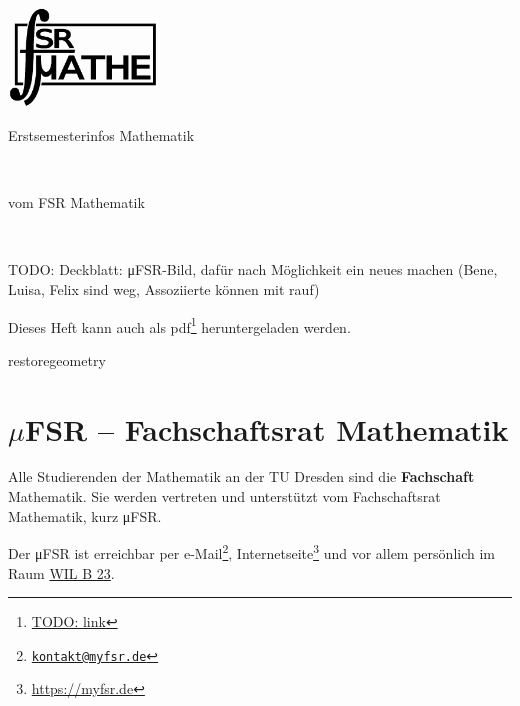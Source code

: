 \documentclass{scrartcl}
\begin{document}
%
%
%
\newcommand{\keyword}{\textbf}
\newcommand{\todo}[1]{\marginpar{TODO\\#1}}
\newpage
{ 
  \thispagestyle{empty} %
  \begin{flushright}
    \includegraphics[width=0.3\textwidth]{./fsrlogos/bw_1024.png}
  \end{flushright}
  \begin{center}
    \begin{huge}
      Erstsemesterinfos Mathematik
    \end{huge}\\\bigskip
    \begin{Large}
      vom FSR Mathematik
    \end{Large}\\\bigskip
  \end{center}
  TODO: Deckblatt: μFSR-Bild, dafür nach Möglichkeit ein neues machen (Bene, Luisa, Felix sind weg, Assoziierte können mit rauf) 
  \vfill
  \begin{small}
    Dieses Heft kann auch als pdf\footnote{\url{TODO: link}} heruntergeladen werden.
  \end{small}
  \newpage
}
restoregeometry %
\pagestyle{plain}
\section*{\texorpdfstring{$\mu$}{my}FSR -- Fachschaftsrat Mathematik}
Alle Studierenden der Mathematik an der TU Dresden sind die \keyword{Fachschaft} Mathematik.
Sie werden vertreten und unterstützt vom Fachschaftsrat Mathematik, kurz μFSR.

Der μFSR ist erreichbar per e-Mail\footnote{\href{mailto:kontakt@myfsr.de}{\nolinkurl{kontakt@myfsr.de}}},
Internetseite\footnote{\url{https://myfsr.de}} und vor allem persönlich im Raum
\href{https://navigator.tu-dresden.de/etplan/wil/-1/raum/2193-1.0170}{WIL B 23}.
\end{document}
